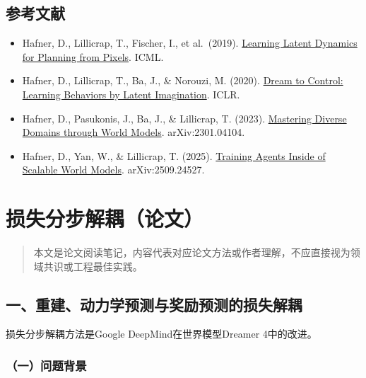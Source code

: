 \hypertarget{ux53c2ux8003ux6587ux732e-187}{%
\subsection{参考文献}\label{ux53c2ux8003ux6587ux732e-187}}

\begin{itemize}
\tightlist
\item
  Hafner, D., Lillicrap, T., Fischer, I., et al.~(2019). \href{https://arxiv.org/abs/1811.04551}{Learning Latent Dynamics for Planning from Pixels}. ICML.
\item
  Hafner, D., Lillicrap, T., Ba, J., \& Norouzi, M. (2020). \href{https://arxiv.org/abs/1912.01603}{Dream to Control: Learning Behaviors by Latent Imagination}. ICLR.
\item
  Hafner, D., Pasukonis, J., Ba, J., \& Lillicrap, T. (2023). \href{https://arxiv.org/abs/2301.04104}{Mastering Diverse Domains through World Models}. arXiv:2301.04104.
\item
  Hafner, D., Yan, W., \& Lillicrap, T. (2025). \href{https://arxiv.org/abs/2509.24527}{Training Agents Inside of Scalable World Models}. arXiv:2509.24527.
\end{itemize}

\clearpage

\hypertarget{ux635fux5931ux5206ux6b65ux89e3ux8026ux8bbaux6587}{%
\section{损失分步解耦（论文）}\label{ux635fux5931ux5206ux6b65ux89e3ux8026ux8bbaux6587}}

\begin{quote}
本文是论文阅读笔记，内容代表对应论文方法或作者理解，不应直接视为领域共识或工程最佳实践。
\end{quote}

\hypertarget{ux4e00ux91cdux5efaux52a8ux529bux5b66ux9884ux6d4bux4e0eux5956ux52b1ux9884ux6d4bux7684ux635fux5931ux89e3ux8026}{%
\subsection{一、重建、动力学预测与奖励预测的损失解耦}\label{ux4e00ux91cdux5efaux52a8ux529bux5b66ux9884ux6d4bux4e0eux5956ux52b1ux9884ux6d4bux7684ux635fux5931ux89e3ux8026}}

损失分步解耦方法是Google DeepMind在世界模型Dreamer 4中的改进。

\hypertarget{ux4e00ux95eeux9898ux80ccux666f-11}{%
\subsubsection{（一）问题背景}\label{ux4e00ux95eeux9898ux80ccux666f-11}}

